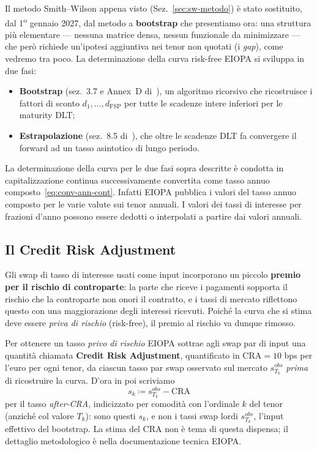 \documentclass[11pt,a4paper]{article}
\theoremstyle{plain}
\theoremstyle{definition}
\theoremstyle{remark}
\newcommand{\UFR}{\mathrm{UFR}}
\newcommand{\FSP}{\mathrm{FSP}}
\newcommand{\CRA}{\mathrm{CRA}}
\newcommand{\defeq}{\coloneqq}
\begin{document}
Il metodo Smith--Wilson appena visto (Sez.~\ref{sec:sw-metodo}) \`e stato sostituito, dal
1\textsuperscript{o} gennaio 2027, dal metodo a \textbf{bootstrap} che presentiamo ora: una
struttura pi\`u elementare --- nessuna matrice densa, nessun funzionale da minimizzare ---
che per\`o richiede un'ipotesi aggiuntiva nei tenor non quotati (i \emph{gap}), come vedremo
tra poco. La determinazione della curva risk-free EIOPA si sviluppa in due fasi: \begin{itemize}
    \item \textbf{Bootstrap}
(sez.~3.7 e Annex~D di~\cite{eiopa2026}), un algoritmo ricorsivo che ricostruisce i fattori di
sconto $d_1,\ldots,d_{\FSP}$ per tutte le scadenze intere inferiori per le maturity DLT; %
\item \textbf{Estrapolazione}
(sez.~8.5 di~\cite{eiopa2026}), che oltre le scadenze DLT fa convergere il forward ad un tasso asintotico di lungo periodo. %
\end{itemize}  
La determinazione della curva per le due fasi sopra descritte \`e condotta in capitalizzazione continua 
successivamente convertita come tasso annuo composto~\eqref{eq:conv-ann-cont}. 
Infatti EIOPA pubblica i valori del tasso annuo composto per le varie valute sui tenor annuali. 
I valori dei tassi di interesse per frazioni d'anno possono essere dedotti o interpolati 
a partire dai valori annuali.

\subsection{Il Credit Risk Adjustment}
\label{sec:cra}

Gli swap di tasso di interesse usati come input incorporano un piccolo \textbf{premio
per il rischio di controparte}: la parte che riceve i pagamenti sopporta il rischio che la
controparte non onori il contratto, e i tassi di mercato riflettono questo con una maggiorazione degli interessi ricevuti.
Poich\'e la curva che si stima deve essere \emph{priva di rischio} (risk-free), 
il premio al rischio va dunque rimosso.

Per ottenere un tasso \emph{privo di rischio} EIOPA sottrae agli swap par di input una quantità chiamata \textbf{Credit Risk
Adjustment}, quantificato in $\CRA = 10$ bps per l'euro per ogni tenor, da ciascun tasso par swap osservato sul mercato $s^{obs}_{T_k}$
\emph{prima} di ricostruire la curva.
D'ora in poi scriviamo
\begin{equation}
  \label{eq:cra-def}
  s_k \defeq s^{obs}_{T_k} - \CRA
\end{equation}
per il tasso \emph{after-CRA}, indicizzato per comodit\`a con l'ordinale $k$ del tenor
(anzich\'e col valore $T_k$): sono questi $s_k$, e non i tassi swap lordi $s^{obs}_{T_k}$, l'input
effettivo del bootstrap. La stima del $\CRA$ non \`e tema di questa dispensa; il dettaglio
metodologico \`e nella documentazione tecnica EIOPA.
\end{document}
